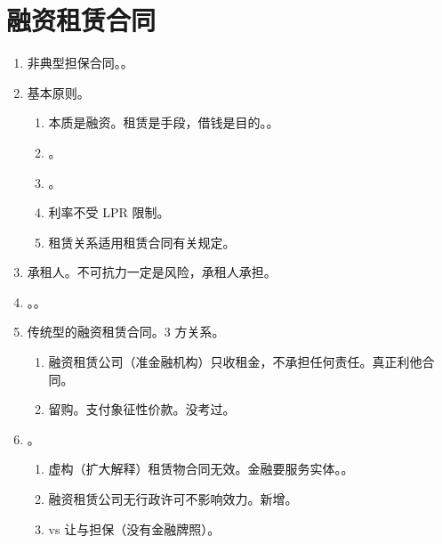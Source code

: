 \section{融资租赁合同}
\begin{enumerate}
  \item 非典型担保合同。。
  \item 基本原则。
        \begin{enumerate}
          \item 本质是融资。租赁是手段，借钱是目的。。
          \item {}。
          \item {}。
          \item 利率不受 LPR 限制。
          \item 租赁关系适用租赁合同有关规定。
        \end{enumerate}
  \item 承租人。不可抗力一定是风险，承租人承担。
  \item {}。。
  \item 传统型的融资租赁合同。3 方关系。
        \begin{enumerate}
          \item 融资租赁公司（准金融机构）只收租金，不承担任何责任。真正利他合同。
          \item 留购。支付象征性价款。没考过。
        \end{enumerate}
  \item {}。
        \begin{enumerate}
          \item 虚构（扩大解释）租赁物合同无效。金融要服务实体。。
          \item 融资租赁公司无行政许可不影响效力。新增。
          \item vs 让与担保（没有金融牌照）。
        \end{enumerate}
\end{enumerate}
